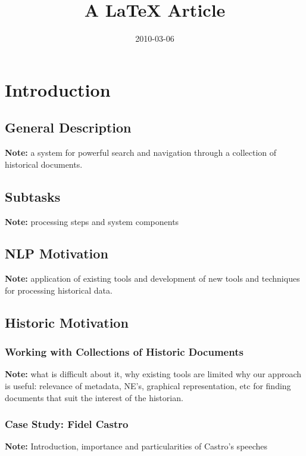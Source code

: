 \documentclass[12pt]{article}
\title{A LaTeX Article}
\author{  }
\date{2010-03-06}
\newcommand{\note}[1]{{\textbf{Note:} \color{blue} #1}}
\begin{document}
\ifpdf
{}
\else
{}
\fi

\maketitle
\tableofcontents

\begin{abstract}
\end{abstract}


\section{Introduction} %
\label{sec:introduction}


	\subsection{General Description}
	\note a system for powerful search and navigation through a collection of historical documents.
	
	\subsection{Subtasks}
 	\note processing steps and system components

	\subsection {NLP Motivation}
	\note application of existing tools and development of new tools and techniques for processing historical data.
	
	\subsection{Historic Motivation}
		\subsubsection{Working with Collections of Historic Documents}
 		\note what is difficult about it, why existing tools are limited 
 					why our approach is useful:
 					relevance of metadata, NE's, graphical representation, etc for finding documents that suit the interest of the 
 					historian.
		\subsubsection{Case Study: Fidel Castro}
 		\note Introduction, importance and particularities of Castro's speeches
\end{document}
